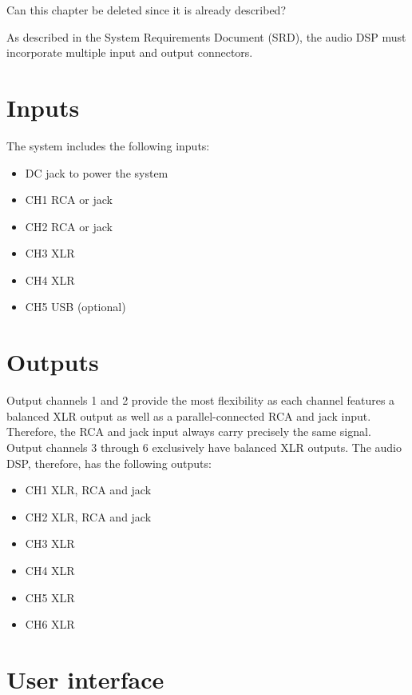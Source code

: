 Can this chapter be deleted since it is already described?

As described in the System Requirements Document (SRD), the audio DSP must incorporate multiple input and output connectors.

\section{Inputs}
The system includes the following inputs:
\begin{itemize}
    \item DC jack to power the system
    \item CH1 RCA or jack
    \item CH2 RCA or jack
    \item CH3 XLR
    \item CH4 XLR
    \item CH5 USB (optional)
\end{itemize}

\section{Outputs}
Output channels 1 and 2 provide the most flexibility as each channel features a balanced XLR output as well as a parallel-connected RCA and jack input. Therefore, the RCA and jack input always carry precisely the same signal. Output channels 3 through 6 exclusively have balanced XLR outputs. The audio DSP, therefore, has the following outputs:

\begin{itemize}
    \item CH1 XLR, RCA and jack
    \item CH2 XLR, RCA and jack
    \item CH3 XLR
    \item CH4 XLR
    \item CH5 XLR
    \item CH6 XLR
\end{itemize}

\section{User interface}
